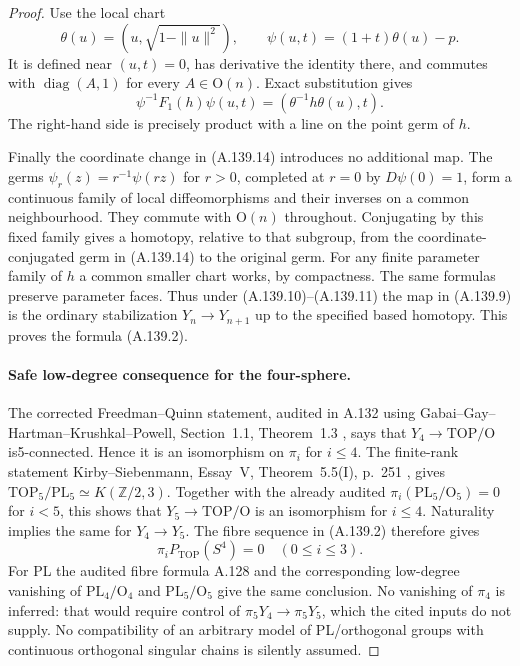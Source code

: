 \begin{proof}
Use the local chart
\[
 \theta(u)=(u,\sqrt{1-\|u\|^2}),\qquad
 \psi(u,t)=(1+t)\theta(u)-p.                            \tag{A.139.13}
\]
It is defined near $(u,t)=0$, has derivative the identity there,
and commutes with $\operatorname{diag}(A,1)$ for every
$A\in\mathrm O(n)$. Exact substitution gives
\[
 \psi^{-1}F_1(h)\psi(u,t)
                    =(\theta^{-1}h\theta(u),t).       \tag{A.139.14}
\]
The right-hand side is precisely product with a line on the
point germ of $h$.

Finally the coordinate change in (A.139.14) introduces no additional
map. The germs $\psi_r(z)=r^{-1}\psi(rz)$ for $r>0$, completed
at $r=0$ by $D\psi(0)=1$, form a continuous family of local
diffeomorphisms and their inverses on a common neighbourhood.
They commute with $\mathrm O(n)$ throughout. Conjugating by this
fixed family gives a homotopy, relative to that subgroup, from
the coordinate-conjugated germ in (A.139.14) to the original germ.
For any finite parameter family of $h$ a common smaller chart
works, by compactness. The same formulas preserve parameter faces.
Thus under (A.139.10)--(A.139.11) the map in (A.139.9) is the ordinary stabilization
$Y_n\to Y_{n+1}$ up to the specified based homotopy. This proves
the formula (A.139.2).

\paragraph{Safe low-degree consequence for the four-sphere.}
The corrected Freedman--Quinn statement, audited in A.132 using
Gabai--Gay--Hartman--Krushkal--Powell, Section~1.1, Theorem~1.3
\cite{GabaiGayHartmanKrushkalPowell2026}, says that
$Y_4\to\mathrm{TOP}/\mathrm O$ is5-connected. Hence it is an
isomorphism on $\pi_i$ for $i\le4$. The finite-rank statement
Kirby--Siebenmann, Essay~V, Theorem~5.5(I), p.~251
\cite{KirbySiebenmann1977}, gives
$\mathrm{TOP}_5/\mathrm{PL}_5\simeq K(\mathbb Z/2,3)$.
Together with the already audited
$\pi_i(\mathrm{PL}_5/\mathrm O_5)=0$ for $i<5$, this shows that
$Y_5\to\mathrm{TOP}/\mathrm O$ is an isomorphism for $i\le4$.
Naturality implies the same for $Y_4\to Y_5$.
The fibre sequence in (A.139.2) therefore gives
\[
                \pi_iP_{\mathrm{TOP}}(S^4)=0
                           \quad(0\le i\le3).         \tag{A.139.15}
\]
For PL the audited fibre formula A.128 and the corresponding
low-degree vanishing of $\mathrm{PL}_4/\mathrm O_4$ and
$\mathrm{PL}_5/\mathrm O_5$ give the same conclusion.
No vanishing of $\pi_4$ is inferred: that would require control
of $\pi_5Y_4\to\pi_5Y_5$, which the cited inputs do not supply.
No compatibility of an arbitrary model of PL/orthogonal groups
with continuous orthogonal singular chains is silently assumed.

\end{proof}
